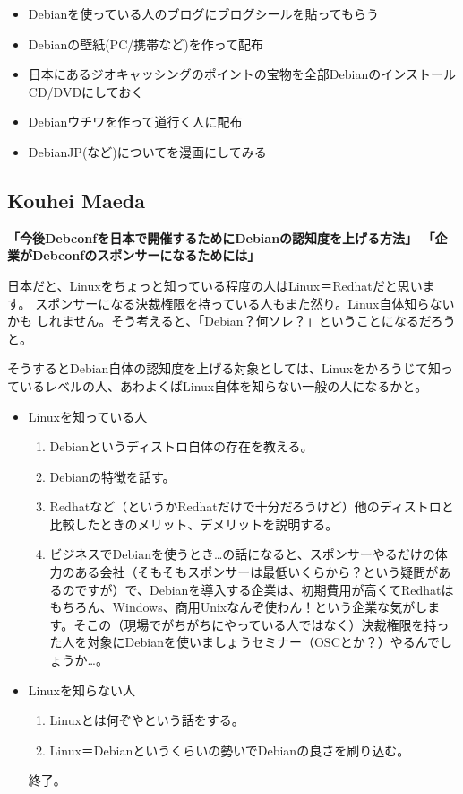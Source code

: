 \documentclass[mingoth,a4paper]{jsarticle}
\begin{document}
\begin{itemize}
 \item  Debianを使っている人のブログにブログシールを貼ってもらう
 \item  Debianの壁紙(PC/携帯など)を作って配布
 \item  日本にあるジオキャッシングのポイントの宝物を全部Debianのインストール
 CD/DVDにしておく
 \item  Debianウチワを作って道行く人に配布
 \item  DebianJP(など)についてを漫画にしてみる
\end{itemize}


\subsection{Kouhei Maeda}

\textbf{「今後Debconfを日本で開催するためにDebianの認知度を上げる方法」
「企業がDebconfのスポンサーになるためには」}

日本だと、Linuxをちょっと知っている程度の人はLinux＝Redhatだと思います。
スポンサーになる決裁権限を持っている人もまた然り。Linux自体知らないかも
しれません。そう考えると、「Debian？何ソレ？」ということになるだろうと。

そうするとDebian自体の認知度を上げる対象としては、Linuxをかろうじて知っているレベルの人、あわよくばLinux自体を知らない一般の人になるかと。

\begin{itemize}
 \item  Linuxを知っている人
 \begin{enumerate}
 \item Debianというディストロ自体の存在を教える。
 \item Debianの特徴を話す。
 \item Redhatなど（というかRedhatだけで十分だろうけど）他のディストロと比較したときのメリット、デメリットを説明する。
 \item ビジネスでDebianを使うとき…の話になると、スポンサーやるだけの体力のある会社（そもそもスポンサーは最低いくらから？という疑問があるのですが）で、Debianを導入する企業は、初期費用が高くてRedhatはもちろん、Windows、商用Unixなんぞ使わん！という企業な気がします。そこの（現場でがちがちにやっている人ではなく）決裁権限を持った人を対象にDebianを使いましょうセミナー（OSCとか？）やるんでしょうか…。
 \end{enumerate}

 \item  Linuxを知らない人
 \begin{enumerate}
 \item Linuxとは何ぞやという話をする。
 \item Linux＝Debianというくらいの勢いでDebianの良さを刷り込む。
 \end{enumerate}
 終了。
\end{itemize}
\end{document}
